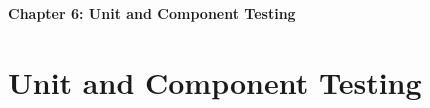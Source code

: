 \cleardoublepage %
\thispagestyle{plain} %

\vspace*{\fill}
\begin{center}
    {\Huge\bfseries Chapter 6: Unit and Component Testing \par}
    \vspace{1cm}
\end{center}
\vspace*{\fill}

\clearpage %


\chapter{Unit and Component Testing}
\label{chap:system_testing}










